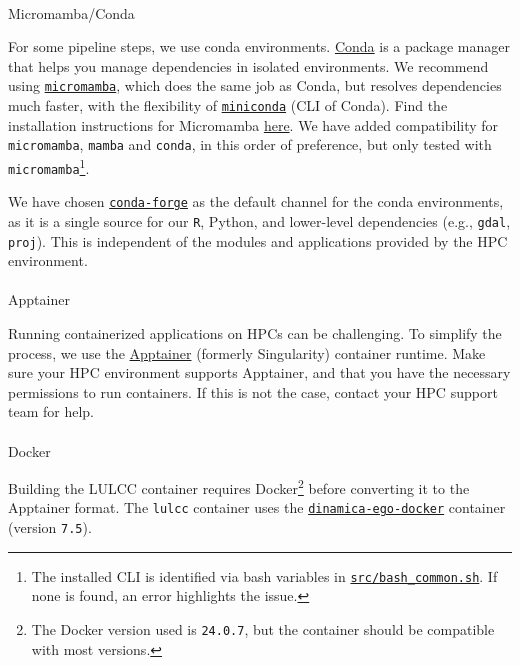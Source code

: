 \documentclass[
  letterpaper,
  DIV=11,
  numbers=noendperiod]{scrreprt}
\makeatletter
\let\oldparagraph\paragraph
\renewcommand{\paragraph}{
    \@ifstar
      \xxxParagraphStar
      \xxxParagraphNoStar
  }
\newcommand{\xxxParagraphStar}[1]{\oldparagraph*{#1}\mbox{}}
\newcommand{\xxxParagraphNoStar}[1]{\oldparagraph{#1}\mbox{}}
\makeatother
\begin{document}
\paragraph{Micromamba/Conda}\label{micromambaconda}

For some pipeline steps, we use conda environments.
\href{https://docs.conda.io/projects/conda/en/stable/}{Conda} is a
package manager that helps you manage dependencies in isolated
environments. We recommend using
\href{https://mamba.readthedocs.io/en/latest/}{\texttt{micromamba}},
which does the same job as Conda, but resolves dependencies much faster,
with the flexibility of
\href{https://docs.conda.io/en/latest/miniconda.html}{\texttt{miniconda}}
(CLI of Conda). Find the installation instructions for Micromamba
\href{https://mamba.readthedocs.io/en/latest/installation/micromamba-installation.html}{here}.
We have added compatibility for \texttt{micromamba}, \texttt{mamba} and
\texttt{conda}, in this order of preference, but only tested with
\texttt{micromamba}\footnote{The installed CLI is identified via bash
  variables in
  \href{https://github.com/cbueth/Future-EI/tree/main/src/bash_common.sh}{\texttt{src/bash\_common.sh}}.
  If none is found, an error highlights the issue.}.

We have chosen \href{https://conda-forge.org/}{\texttt{conda-forge}} as
the default channel for the conda environments, as it is a single source
for our \texttt{R}, Python, and lower-level dependencies (e.g.,
\texttt{gdal}, \texttt{proj}). This is independent of the modules and
applications provided by the HPC environment.

\paragraph{Apptainer}\label{apptainer}

Running containerized applications on HPCs can be challenging. To
simplify the process, we use the
\href{https://apptainer.org/}{Apptainer} (formerly Singularity)
container runtime. Make sure your HPC environment supports Apptainer,
and that you have the necessary permissions to run containers. If this
is not the case, contact your HPC support team for help.

\paragraph{Docker}\label{docker}

Building the LULCC container requires Docker\footnote{The Docker version
  used is \texttt{24.0.7}, but the container should be compatible with
  most versions.} before converting it to the Apptainer format. The
\texttt{lulcc} container uses the
\href{https://github.com/cbueth/dinamica-ego-docker/}{\texttt{dinamica-ego-docker}}
container (version \texttt{7.5}).
\end{document}
